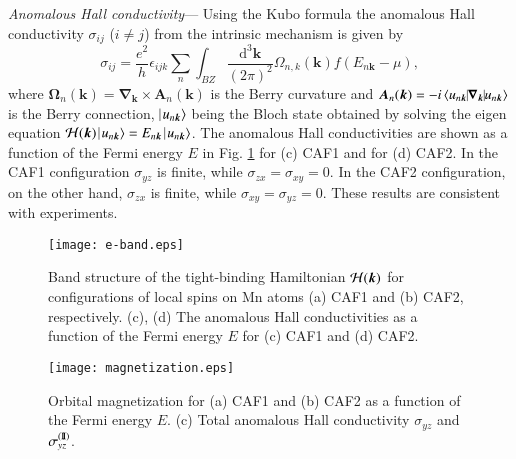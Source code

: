 \documentclass[letter,twocolumn,amsmath,amssymb,superscriptaddress]{jpsj3}
\newcommand{\vk}{\bm{k}}
\begin{document}
{\it Anomalous Hall conductivity}---
Using the Kubo formula the anomalous Hall conductivity $\sigma_{ij}$ ($i\ne j$)  from the intrinsic mechanism is given by 
\begin{equation}
\sigma_{ij}=\frac{e^2}{h}\epsilon_{ijk}\sum_n\int_{BZ}\frac{\mathrm{d}^3\vk}{(2\pi)^2}\Omega_{n,k}(\vk)
f(E_{n\vk}-\mu),
\label{eq:AHC}
\end{equation}
where 
$\bm{\Omega}_n(\vk)=\bm{\nabla}_{\vk}\times\bm{A}_n(\vk)$
is the Berry curvature and 
$\bm{A}_n(\vk)=-i\left<u_{n\vk}\vline\bm{\nabla}_{\vk}\vline u_{n\vk}\right>$
is the Berry connection, $\vline\, u_{n\vk}\rangle$ being the Bloch state obtained by solving  the eigen equation 
$
{\cal H}(\vk)\,\vline\,
u_{n\vk}
\rangle=
E_{n\vk} \,\vline\, u_{n\vk} \rangle
$.
The anomalous Hall conductivities are shown as a function of the Fermi energy $E$ in Fig. \ref{fig:Ek} for (c) CAF1 and for (d) CAF2. In the CAF1 configuration $\sigma_{yz}$ is finite, while $\sigma_{zx}=\sigma_{xy}=0$.
In the CAF2 configuration, on the other hand, $\sigma_{zx}$ is finite, while $\sigma_{xy}=\sigma_{yz}=0$.
These results are consistent with experiments\cite{Nakatsuji2015,Nayak2015,Kiyohara2016,Li2017}.


\begin{figure}[t]
 \leavevmode\texttt{[image: e-band.eps]} %
 \caption{
Band structure of the tight-binding Hamiltonian ${\cal H}(\vk)$ for configurations of local spins on Mn atoms (a) CAF1 and (b) CAF2, respectively. (c), (d)  The anomalous Hall conductivities as a function of the Fermi energy $E$ for (c) CAF1 and (d) CAF2.
 }
 \label{fig:Ek}
\end{figure}





\begin{figure}[b]
 \leavevmode\texttt{[image: magnetization.eps]} %
 \caption{
Orbital magnetization for (a) CAF1 and (b) CAF2 as a function of the Fermi energy $E$.
(c) Total anomalous Hall conductivity $\sigma_{yz}$ and $\sigma_{yz}^{(\rm I\!I)}$.
 }
 \label{energy}
\end{figure}




\end{document}
